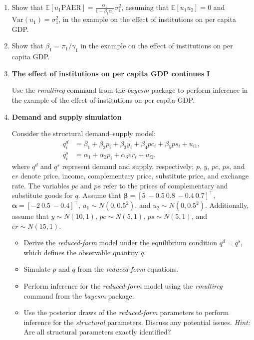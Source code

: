 \begin{enumerate}
	
	\item Show that $\mathbb{E}[u_1\text{PAER}] = \frac{\alpha_1}{1 - \beta_1\alpha_1} \sigma_1^2$, assuming that $\mathbb{E}[u_1 u_2] = 0$ and $\text{Var}(u_1) = \sigma_1^2$, in the example on the effect of institutions on per capita GDP.
	
	\item Show that $\beta_1 = \pi_1 / \gamma_1$ in the example on the effect of institutions on per capita GDP.
	
	\item \textbf{The effect of institutions on per capita GDP continues I}
	
	Use the \textit{rmultireg} command from the \textit{bayesm} package to perform inference in the example of the effect of institutions on per capita GDP.
	
	\item \textbf{Demand and supply simulation}
	
	Consider the structural demand–supply model:
	\begin{align*}
		q_i^d &= \beta_1 + \beta_2 p_i + \beta_3 y_i + \beta_4 pc_i + \beta_5 ps_i + u_{i1}, \\
		q_i^s &= \alpha_1 + \alpha_2 p_i + \alpha_3 er_i + u_{i2},
	\end{align*}
	where $q^d$ and $q^s$ represent demand and supply, respectively; $p$, $y$, $pc$, $ps$, and $er$ denote price, income, complementary price, substitute price, and exchange rate. The variables $pc$ and $ps$ refer to the prices of complementary and substitute goods for $q$. Assume that $\bm{\beta} = [5 \ -0.5 \ 0.8 \ -0.4 \ 0.7]^{\top}$, $\bm{\alpha} = [-2 \ 0.5 \ -0.4]^{\top}$, $u_1 \sim N(0, 0.5^2)$, and $u_2 \sim N(0, 0.5^2)$. Additionally, assume that $y \sim N(10, 1)$, $pc \sim N(5, 1)$, $ps \sim N(5, 1)$, and $er \sim N(15, 1)$.
	
	\begin{itemize}
		\item Derive the \textit{reduced-form} model under the equilibrium condition $q^d = q^s$, which defines the observable quantity $q$.
		\item Simulate $p$ and $q$ from the \textit{reduced-form} equations.
		\item Perform inference for the \textit{reduced-form} model using the \textit{rmultireg} command from the \textit{bayesm} package.
		\item Use the posterior draws of the \textit{reduced-form} parameters to perform inference for the \textit{structural} parameters. Discuss any potential issues. \textit{Hint:} Are all structural parameters exactly identified?
	\end{itemize}
	

\end{enumerate}
